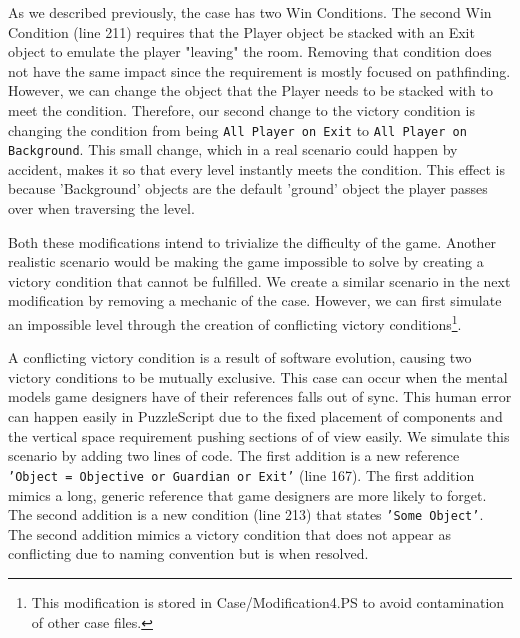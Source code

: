 As we described previously, the case has two Win Conditions. The second Win Condition (line 211) requires that the Player object be stacked with an Exit object to emulate the player "leaving" the room. Removing that condition does not have the same impact since the requirement is mostly focused on pathfinding. However, we can change the object that the Player needs to be stacked with to meet the condition. Therefore, our second change to the victory condition is changing the condition from being \texttt{All Player on Exit} to \texttt{All Player on Background}. This small change, which in a real scenario could happen by accident, makes it so that every level instantly meets the condition. This effect is because 'Background' objects are the default 'ground' object the player passes over when traversing the level.

Both these modifications intend to trivialize the difficulty of the game. Another realistic scenario would be making the game impossible to solve by creating a victory condition that cannot be fulfilled. We create a similar scenario in the next modification by removing a mechanic of the case. However, we can first simulate an impossible level through the creation of conflicting victory conditions\footnote{This modification is stored in Case/Modification4.PS to avoid contamination of other case files.}.

A conflicting victory condition is a result of software evolution, causing two victory conditions to be mutually exclusive. This case can occur when the mental models game designers have of their references falls out of sync. This human error can happen easily in PuzzleScript due to the fixed placement of components and the vertical space requirement pushing sections of of view easily. We simulate this scenario by adding two lines of code. The first addition is a new reference \texttt{'Object = Objective or Guardian or Exit'} (line 167). The first addition mimics a long, generic reference that game designers are more likely to forget. The second addition is a new condition (line 213) that states \texttt{'Some Object'}. The second addition mimics a victory condition that does not appear as conflicting due to naming convention but is when resolved.

